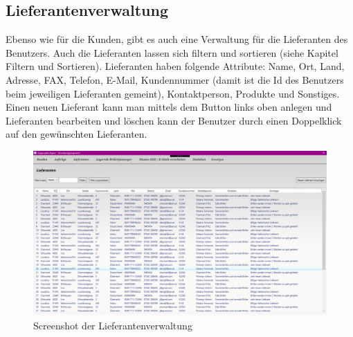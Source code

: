 \subsection{Lieferantenverwaltung}
Ebenso wie für die Kunden, gibt es auch eine Verwaltung für die Lieferanten des Benutzers. Auch die Lieferanten lassen sich filtern und sortieren (siehe Kapitel Filtern und Sortieren). Lieferanten haben folgende Attribute: Name, Ort, Land, Adresse, FAX, Telefon, E-Mail, Kundennummer (damit ist die Id des Benutzers beim jeweiligen Lieferanten gemeint), Kontaktperson, Produkte und Sonstiges. Einen neuen Lieferant kann man mittels dem Button links oben anlegen und Lieferanten bearbeiten und löschen kann der Benutzer durch einen Doppelklick auf den gewünschten Lieferanten.
\begin{figure}[H]
\begin{center}
	\includegraphics[scale=.25]{images/Lieferanten.png}
\end{center}
	\caption{Screenshot der Lieferantenverwaltung}
	\label{fig:sample}
\end{figure}

